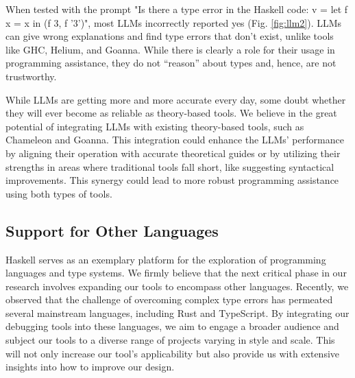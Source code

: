 When tested with the prompt "Is there a type error in the Haskell code: v = let f x = x in (f 3, f '3')", most LLMs incorrectly reported yes (Fig. \ref{fig:llm2}). LLMs can give wrong explanations and find type errors that don't exist, unlike tools like GHC, Helium, and Goanna. While there is clearly a role for their usage in programming assistance, they do not “reason” about types and, hence, are not trustworthy.

While LLMs are getting more and more accurate every day, some doubt whether they will ever become as reliable as theory-based tools. We believe in the great potential of integrating LLMs with existing theory-based tools, such as Chameleon and Goanna. This integration could enhance the LLMs' performance by aligning their operation with accurate theoretical guides or by utilizing their strengths in areas where traditional tools fall short, like suggesting syntactical improvements. This synergy could lead to more robust programming assistance using both types of tools.


\subsection{Support for Other Languages}
Haskell serves as an exemplary platform for the exploration of programming languages and type systems. We firmly believe that the next critical phase in our research involves expanding our tools to encompass other languages. Recently, we observed that the challenge of overcoming complex type errors has permeated several mainstream languages, including Rust and TypeScript. By integrating our debugging tools into these languages, we aim to engage a broader audience and subject our tools to a diverse range of projects varying in style and scale. This will not only increase our tool's applicability but also provide us with extensive insights into how to improve our design.

